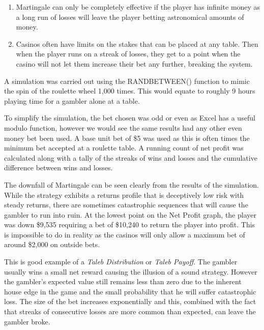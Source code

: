 \documentclass[12pt]{article}
\begin{document}
\begin{enumerate}
\item Martingale can only be completely effective if the player has infinite money as a long run of losses will leave the player betting astronomical amounts of money.
\item Casinos often have limits on the stakes that can be placed at any table. Then when the player runs on a streak of losses, they get to a point when the casino will not let them increase their bet any further, breaking the system.
\end{enumerate}

A simulation was carried out using the RANDBETWEEN() function to mimic the spin of the roulette wheel 1,000 times. This would equate to roughly 9 hours playing time for a gambler alone at a table.

To simplify the simulation, the bet chosen was odd or even as Excel has a useful modulo function, however we would see the same results had any other even money bet been used. A base unit bet of \$5 was used as this is often times the minimum bet accepted at a roulette table. A running count of net profit was calculated along with a tally of the streaks of wins and losses and the cumulative difference between wins and losses.

The downfall of Martingale can be seen clearly from the results of the simulation. While the strategy exhibits a returns profile that is deceptively low risk with steady returns, there are sometimes catastrophic sequences that will cause the gambler to run into ruin. At the lowest point on the Net Profit graph, the player was down \$9,535 requiring a bet of \$10,240 to return the player into profit. This is impossible to do in reality as the casinos will only allow a maximum bet of around \$2,000 on outside bets.

This is good example of a \emph{Taleb Distribution} or \emph{Taleb Payoff}. The gambler usually wins a small net reward causing the illusion of a sound strategy. However the gambler’s expected value still remains less than zero due to the inherent house edge in the game and the small probability that he will suffer catastrophic loss. The size of the bet increases exponentially and this, combined with the fact that streaks of consecutive losses are more common than expected, can leave the gambler broke.
\end{document}

